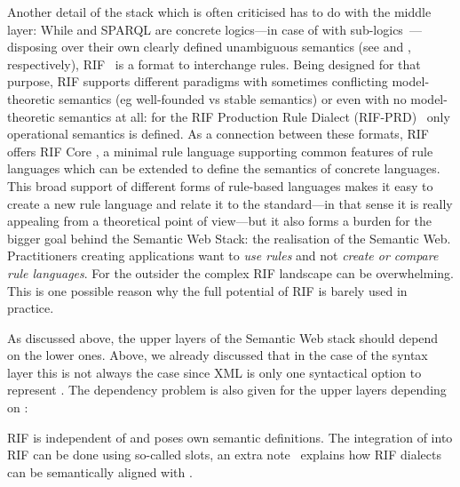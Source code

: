 Another detail of the stack which is often criticised has to do with the middle layer: While \owl and SPARQL are concrete logics---in case of \owl 
with sub-logics~\cite{OWLRL}---disposing 
over their own clearly defined unambiguous semantics (see \cite{owlrdfsem,owldsem} 
and \cite{sparql}, respectively), RIF~\cite{rif} is a format to interchange rules. Being designed for that purpose, RIF supports different paradigms with sometimes 
conflicting model-theoretic semantics (eg well-founded vs stable semantics) or even with no model-theoretic semantics at all: 
for the RIF Production Rule Dialect (RIF-PRD)~\cite{rifprd} only operational semantics is defined. 
As a connection between these formats, RIF offers RIF Core \cite{rifcore}, a minimal rule language supporting common features of rule languages which can be 
extended to define the semantics of concrete languages.
This broad support of different forms of rule-based languages makes it easy to create a new rule language and relate it to the standard---in that sense it is really
appealing from a theoretical point of view---but it also forms a burden for the bigger goal
behind the Semantic Web Stack: the realisation of the Semantic Web. Practitioners creating applications want to \emph{use rules}
and not  \emph{create or compare rule languages}. For the outsider the complex RIF landscape can be overwhelming. This is one possible reason why the 
full potential of RIF is barely used in practice. 


As discussed above, the upper layers of the Semantic Web stack should depend on the lower ones. 
Above, we already discussed that in the case of the syntax layer this is not always the case 
since XML is only one syntactical option to represent \rdf. The dependency problem is also given for the upper layers depending on \rdf:

RIF is independent of \rdf and poses own semantic definitions. The integration of \rdf into RIF can be done using so-called slots, an extra note~\cite{rifrdf} 
explains how RIF dialects 
can be semantically aligned with \rdf. 
%

